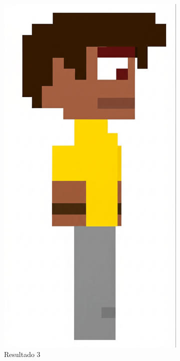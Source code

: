 \begin{figure}[htbp]
\begin{subfigure}{0.23\linewidth}
        \includegraphics[width=1\linewidth]{figs/geminiPro/chat2/res3_tela2.png}
        \caption{\small Resultado 3}
        \label{fig:geminiPro5c}
    \end{subfigure}
    \begin{subfigure}{0.23\linewidth}

\end{subfigure}
\end{figure}
